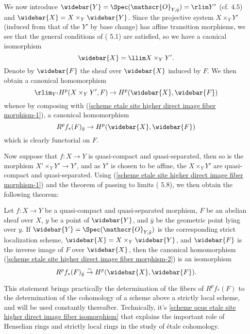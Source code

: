 We now introduce $\widebar{Y}=\Spec(\mathscr{O}_{Y,\bar{y}})=\rlim Y'$ (cf. \cite{SGA4-2}  4.5) and $\widebar{X}=X\times_Y\widebar{Y}$. Since the projective system $X\times_YY'$ (induced from that of the $Y'$ by base change) has affine transition morphisms, we see that the general conditions of (\cite{SGA4-2}  5.1) are satisfied, so we have a caonical isomorphism
\[\widebar{X}=\llim X\times_YY'.\]
Denote by $\widebar{F}$ the sheaf over $\widebar{X}$ induced by $F$. We then obtain a canonical homomorphism
\[\rlim_{Y'}H^p(X\times_YY',F)\to H^p(\widebar{X},\widebar{F})\]
whence by composing with (\ref{scheme etale site higher direct image fiber morphism-1}), a canonical homomorphism
\begin{equation}\label{scheme etale site higher direct image fiber morphism-2}
R^pf_*(F)_{\bar{y}}\to H^p(\widebar{X},\widebar{F})
\end{equation}
which is clearly functorial on $F$.\par
Now suppose that $f:X\to Y$ is quasi-compact and quasi-separated, then so is the morphism $X'\times_YY'\to Y'$, and as $Y'$ is chosen to be affine, the $X\times_YY'$ are quasi-compact and quasi-separated. Using (\ref{scheme etale site higher direct image fiber morphism-1}) and the theorem of passing to limits (\cite{SGA4-2}  5.8), we then obtain the following theorem:
\begin{theorem}\label{scheme qcqs etale site higher direct image fiber isomorphism}
Let $f:X\to Y$ be a quasi-compact and quasi-separated morphism, $F$ be an abelian sheaf over $X$, $y$ be a point of $\widebar{Y}$, and $\bar{y}$ be the geometric point lying over $y$. If $\widebar{Y}=\Spec(\mathscr{O}_{Y,\bar{y}})$ is the corresponding strict localization scheme, $\widebar{X}=X\times_Y\widebar{Y}$, and $\widebar{F}$ is the inverse image of $F$ over $\widebar{X}$, then the canonical homomorphism (\ref{scheme etale site higher direct image fiber morphism-2}) is an isomorphism
\[R^pf_*(F)_{\bar{y}}\stackrel{\sim}{\to} H^p(\widebar{X},\widebar{F}).\]
\end{theorem}

This statement brings practically the determination of the fibers of $R^pf_*(F)$ to the determination of the cohomology of a scheme above a strictly local scheme, and will be used constantly thereafter. Technically, it's \cref{scheme qcqs etale site higher direct image fiber isomorphism} that explains the important role of Henselian rings and strictly local rings in the study of \'etale cohomology.\par

